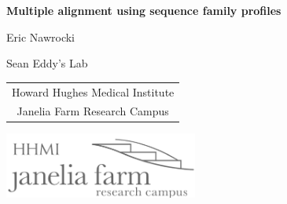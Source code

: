 \documentclass[landscape]{slides}
\begin{document}
\begin{slide}
\begin{center}
\large{\textbf{Multiple alignment using sequence family profiles}}

\normalsize

Eric Nawrocki

Sean Eddy's Lab

\medskip

\medskip

\small

\begin{tabular}{c}
Howard Hughes Medical Institute \\ 
Janelia Farm Research Campus \\
\end{tabular}

\vspace{0.1in}

\includegraphics[width=2.5in]{figs/janelia-logo}
\end{center}
\end{slide}
\end{document}
